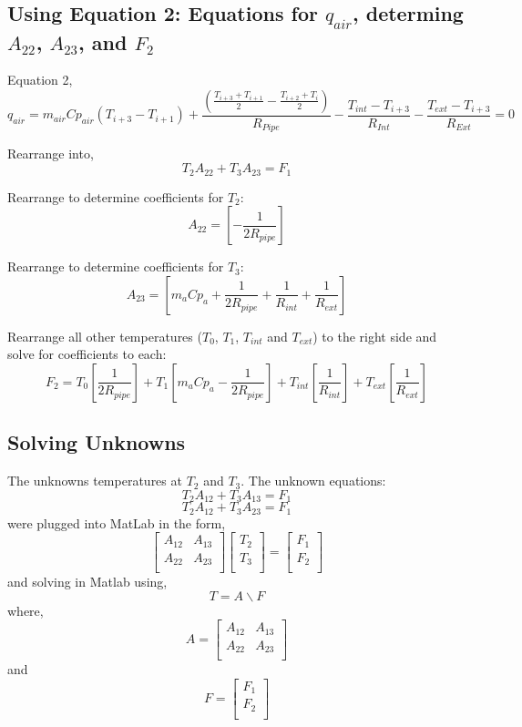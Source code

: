 \documentclass[12pt]{report}
\begin{document}
\subsection{Using Equation 2: Equations for $q_{air}$, determing $A_{22}$, $A_{23}$, and $F_2$}

Equation 2, 
$$ q_{air} = m_{air} Cp_{air} (T_{i+3}-T_{i+1}) 
+ \frac{
	\left( 
	\frac{T_{i+3}+T_{i+1}}{2} 
	- \frac{T_{i+2}+T_{i}}{2} 
	\right)}
{R_{Pipe}} 
- \frac{T_{int} - T_{i+3}}{R_{Int}}
- \frac{T_{ext} - T_{i+3}}{R_{Ext}} = 0 $$

Rearrange into,
$$ T_2 A_{22} + T_3 A_{23} = F_1 $$

Rearrange to determine coefficients for $T_2$:
$$ A_{22} = [- \frac{1}{2 R_{pipe}}] $$

Rearrange to determine coefficients for $T_3$:
$$ A_{23} = [ m_a Cp_a + \frac{1}{2 R_{pipe}} + \frac{1}{R_{int}} + \frac{1}{R_{ext}}] $$

Rearrange all other temperatures ($T_0$, $T_1$, $T_{int}$ and $T_{ext}$) to the right side and solve for coefficients to each:
$$ F_2 = 
	T_0 [\frac{1}{2 R_{pipe}}] 
	+ T_1 [m_a Cp_a - \frac{1}{2 R_{pipe}}] 
	+ T_{int} [\frac{1}{R_{int}}]
	+ T_{ext} [\frac{1}{R_{ext}}]$$


\subsection{Solving Unknowns}
The unknowns temperatures at $T_2$ and $T_3$. The unknown equations: 
$$ T_2 A_{12} + T_3 A_{13} = F_1 $$
$$ T_2 A_{12} + T_3 A_{23} = F_1 $$
were plugged into MatLab in the form, 
$$
\left[ \begin{matrix}
A_{12} & A_{13} \\
A_{22} & A_{23} \\
\end{matrix}\right] 
\left[ \begin{matrix}
T_{2} \\
T_{3} \\
\end{matrix}
\right] 
= \left[ \begin{matrix}
F_1 \\
F_2 \\
\end{matrix}
\right]
$$
and solving in Matlab using,
$$ T = A \backslash F $$
where, 
$$ A = \left[ \begin{matrix}
A_{12} & A_{13} \\
A_{22} & A_{23} \\
\end{matrix}\right] $$
and
$$ F = \left[ \begin{matrix}
F_1 \\
F_2 \\
\end{matrix}
\right] $$
\end{document}
